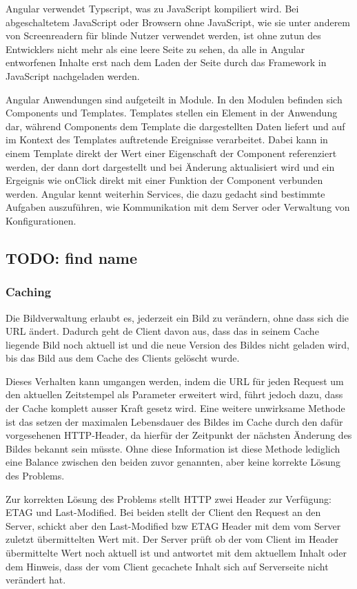 Angular verwendet Typscript, was zu JavaScript kompiliert wird. Bei
abgeschaltetem JavaScript oder Browsern ohne JavaScript, wie sie unter anderem
von Screenreadern für blinde Nutzer verwendet werden, ist ohne zutun des
Entwicklers nicht mehr als eine leere Seite zu sehen, da alle in Angular
entworfenen Inhalte erst nach dem Laden der Seite durch das Framework in
JavaScript nachgeladen werden.

Angular Anwendungen sind aufgeteilt in Module. In den Modulen befinden sich
Components und Templates. Templates stellen ein Element in der Anwendung dar,
während Components dem Template die dargestellten Daten liefert und auf im
Kontext des Templates auftretende Ereignisse verarbeitet. Dabei kann in einem
Template direkt der Wert einer Eigenschaft der Component referenziert werden,
der dann dort dargestellt und bei Änderung aktualisiert wird und ein Ergeignis
wie onClick direkt mit einer Funktion der Component verbunden werden. Angular
kennt weiterhin Services, die dazu gedacht sind bestimmte Aufgaben auszuführen,
wie Kommunikation mit dem Server oder Verwaltung von Konfigurationen.

\subsection{TODO: find name}



\subsubsection{Caching}

Die Bildverwaltung erlaubt es, jederzeit ein Bild zu verändern, ohne dass sich
die URL ändert. Dadurch geht de Client davon aus, dass das in seinem Cache
liegende Bild noch aktuell ist und die neue Version des Bildes nicht geladen
wird, bis das Bild aus dem Cache des Clients gelöscht wurde.

Dieses Verhalten kann umgangen werden, indem die URL für jeden Request um den
aktuellen Zeitstempel als Parameter erweitert wird, führt jedoch dazu, dass der
Cache komplett ausser Kraft gesetz wird. Eine weitere unwirksame Methode ist das
setzen der maximalen Lebensdauer des Bildes im Cache durch den dafür
vorgesehenen HTTP-Header, da hierfür der Zeitpunkt der nächsten Änderung des
Bildes bekannt sein müsste. Ohne diese Information ist diese Methode lediglich
eine Balance zwischen den beiden zuvor genannten, aber keine korrekte Lösung des
Problems.

Zur korrekten Lösung des Problems stellt HTTP zwei Header zur Verfügung: ETAG
und Last-Modified. Bei beiden stellt der Client den Request an den Server,
schickt aber den Last-Modified bzw ETAG Header mit dem vom Server zuletzt
übermittelten Wert mit. Der Server prüft ob der vom Client im Header
übermittelte Wert noch aktuell ist und antwortet mit dem aktuellem Inhalt oder
dem Hinweis, dass der vom Client gecachete Inhalt sich auf Serverseite nicht
verändert hat.

